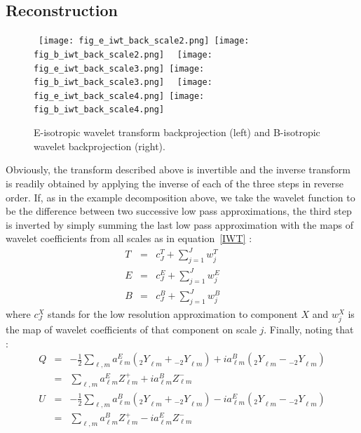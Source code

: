 \subsection*{Reconstruction}
\begin{figure*}[htb]
\centerline{
\vbox{
 \hbox{
 \texttt{[image: fig\_e\_iwt\_back\_scale2.png]}
 \texttt{[image: fig\_b\_iwt\_back\_scale2.png]}
 }
  \hbox{
 \texttt{[image: fig\_e\_iwt\_back\_scale3.png]}
 \texttt{[image: fig\_b\_iwt\_back\_scale3.png]}
 }
 \hbox{
 \texttt{[image: fig\_e\_iwt\_back\_scale4.png]}
 \texttt{[image: fig\_b\_iwt\_back\_scale4.png]}
 }
 }
 }
\caption{E-isotropic wavelet transform backprojection (left) and B-isotropic wavelet backprojection (right).}
\label{fig_eb_iwt_back}
\end{figure*}
Obviously, the transform described above is invertible and the inverse transform is readily obtained by applying the inverse 
of each of the three steps in reverse order. If, as in the example decomposition above, we take the wavelet function to be 
the difference between two successive low pass approximations, the third step is inverted by simply summing the last low pass 
approximation with the maps of wavelet coefficients from all scales as in equation~\eqref{IWT} : 
\begin{eqnarray}
T  & = & c_{J}^T + \sum_{j=1}^{J} w_j^T \quad \quad \nonumber \\
E & = & c_{J}^E + \sum_{j=1}^{J} w_j^E \quad \quad \nonumber \\
B & = &  c_{J}^B + \sum_{j=1}^{J} w_j^B
\end{eqnarray}
where $c_{J}^X$ stands for the low resolution approximation to component $X$ and $w_j^X$ is the map of wavelet coefficients of that component on scale $j$. Finally, noting that : 
\begin{eqnarray}
Q  & =  & -\frac{1}{2} \sum_{\ell, m}   a_{\ell m} ^E   ( {_{ 2} Y}_{\ell m} +  {_{ -2} Y}_{\ell m} ) +  i a_{\ell m} ^B ( {_{ 2} Y}_{\ell m} -  {_{ -2} Y}_{\ell m} )  \nonumber \\
     & =  & \sum_{\ell, m}   a_{\ell m} ^E   Z_{\ell m}^+ +  i a_{\ell m} ^B Z_{\ell m}^-   \\ \nonumber
U  & =   & -\frac{1}{2} \sum_{\ell, m}   a_{\ell m} ^B   ( {_{ 2} Y}_{\ell m} +  {_{ -2} Y}_{\ell m} ) -  i a_{\ell m} ^E ( {_{ 2} Y}_{\ell m} -  {_{ -2} Y}_{\ell m} )  \nonumber \\
      & =  & \sum_{\ell, m}   a_{\ell m} ^B Z_{\ell m}^+ -  i a_{\ell m} ^E Z_{\ell m}^-   
\end{eqnarray}
